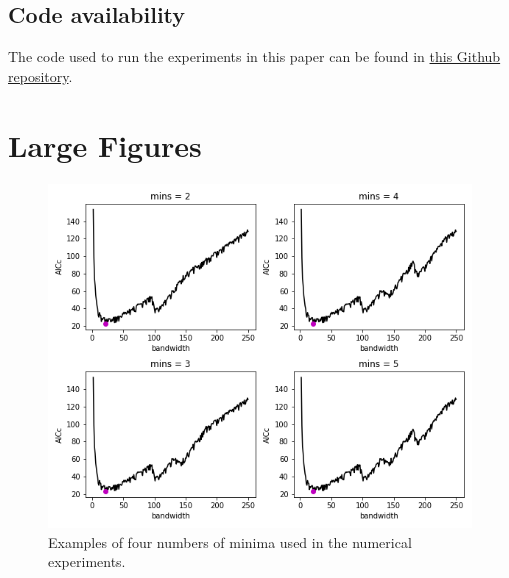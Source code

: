 \documentclass[letterpaper,12pt,twocolumn]{article}
\begin{document}
\subsection*{Code availability}
The code used to run the experiments in this paper can be found in \href{https://github.com/thoffman1/gwr-optimizers}{this Github repository}.

\printbibliography
\pagebreak

\onecolumn
\section*{Large Figures}
\label{sec:figs}

\begin{figure}[h!]
    \centering
    \includegraphics[width=\textwidth]{../figures/multiple-mins-curves.png}
    \caption{Examples of four numbers of minima used in the numerical experiments.}
    \label{fig:multiple-mins}
\end{figure}
\end{document}
